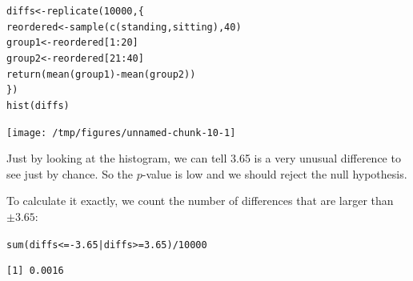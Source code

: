 \documentclass{beamer}\usepackage[]{graphicx}\usepackage[]{color}
\makeatletter
\newcommand{\hlnum}[1]{\textcolor[rgb]{0.824,0.412,0.118}{#1}}%
\newcommand{\hlopt}[1]{\textcolor[rgb]{1,0.894,0.769}{#1}}%
\newcommand{\hlstd}[1]{\textcolor[rgb]{1,0.894,0.769}{#1}}%
\newcommand{\hlkwb}[1]{\textcolor[rgb]{0.804,0.776,0.451}{#1}}%
\newcommand{\hlkwd}[1]{\textcolor[rgb]{1,0.78,0.769}{#1}}%
\newenvironment{kframe}{%
 \def\at@end@of@kframe{}%
 \ifinner\ifhmode%
  \def\at@end@of@kframe{\end{minipage}}%
  \begin{minipage}{\columnwidth}%
 \fi\fi%
 \def\FrameCommand##1{\hskip\@totalleftmargin \hskip-\fboxsep
 \colorbox{shadecolor}{##1}\hskip-\fboxsep
     \hskip-\linewidth \hskip-\@totalleftmargin \hskip\columnwidth}%
 \MakeFramed {\advance\hsize-\width
   \@totalleftmargin\z@ \linewidth\hsize
   \@setminipage}}%
 {\par\unskip\endMakeFramed%
 \at@end@of@kframe}
\newenvironment{knitrout}{}{} %
\makeatother
\begin{document}
\begin{darkframes}
    \begin{frame}[fragile]

\begin{knitrout}
\color{fgcolor}\begin{kframe}
\begin{alltt}
\hlstd{diffs} \hlkwb{<-} \hlkwd{replicate}\hlstd{(}\hlnum{10000}\hlstd{, \{}
  \hlstd{reordered} \hlkwb{<-} \hlkwd{sample}\hlstd{(}\hlkwd{c}\hlstd{(standing, sitting),} \hlnum{40}\hlstd{)}
  \hlstd{group1} \hlkwb{<-} \hlstd{reordered[}\hlnum{1}\hlopt{:}\hlnum{20}\hlstd{]}
  \hlstd{group2} \hlkwb{<-} \hlstd{reordered[}\hlnum{21}\hlopt{:}\hlnum{40}\hlstd{]}
  \hlkwd{return}\hlstd{(}\hlkwd{mean}\hlstd{(group1)} \hlopt{-} \hlkwd{mean}\hlstd{(group2))}
\hlstd{\})}
\hlkwd{hist}\hlstd{(diffs)}
\end{alltt}
\end{kframe}
\texttt{[image: /tmp/figures/unnamed-chunk-10-1]} 

\end{knitrout}
    \end{frame}

    \begin{frame}[fragile]
      Just by looking at the histogram, we can tell 3.65 is a very unusual difference to see just by chance. So the $p$-value is low and we should reject the null hypothesis.

      \pause
      \vspace{2em}

      To calculate it exactly, we count the number of differences that are larger than $\pm 3.65$:
\begin{knitrout}
\color{fgcolor}\begin{kframe}
\begin{alltt}
\hlkwd{sum}\hlstd{(diffs} \hlopt{<= -}\hlnum{3.65} \hlopt{|} \hlstd{diffs} \hlopt{>=} \hlnum{3.65}\hlstd{)} \hlopt{/} \hlnum{10000}
\end{alltt}
\begin{verbatim}
[1] 0.0016
\end{verbatim}
\end{kframe}
\end{knitrout}
    \end{frame}
  \end{darkframes}
\end{document}
